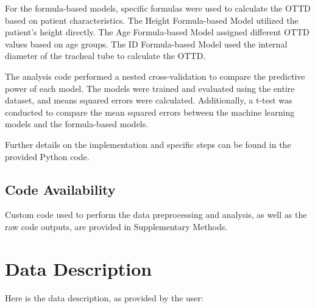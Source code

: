 \documentclass[11pt]{article}
\begin{document}
For the formula-based models, specific formulas were used to calculate the OTTD based on patient characteristics. The Height Formula-based Model utilized the patient's height directly. The Age Formula-based Model assigned different OTTD values based on age groups. The ID Formula-based Model used the internal diameter of the tracheal tube to calculate the OTTD.

The analysis code performed a nested cross-validation to compare the predictive power of each model. The models were trained and evaluated using the entire dataset, and means squared errors were calculated. Additionally, a t-test was conducted to compare the mean squared errors between the machine learning models and the formula-based models.

Further details on the implementation and specific steps can be found in the provided Python code.\subsection*{Code Availability}

Custom code used to perform the data preprocessing and analysis, as well as the raw code outputs, are provided in Supplementary Methods.


\clearpage
\appendix

\section{Data Description} \label{sec:data_description} Here is the data description, as provided by the user:
\end{document}

